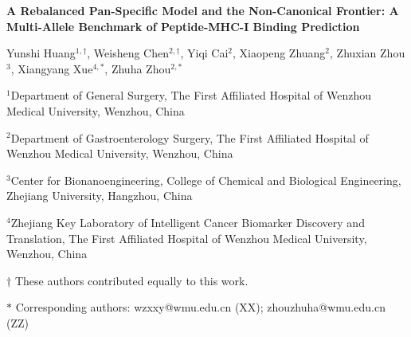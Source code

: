 \documentclass[10pt]{article}
\begin{document}
\begin{center}
{\LARGE\bfseries A Rebalanced Pan-Specific Model and the Non-Canonical Frontier: A Multi-Allele Benchmark of Peptide-MHC-I Binding Prediction\par}
\vspace{1em}
{\large Yunshi Huang$^{1,\dagger}$, Weisheng Chen$^{2,\dagger}$, Yiqi Cai$^{2}$, Xiaopeng Zhuang$^{2}$, Zhuxian Zhou$^{3}$, Xiangyang Xue$^{4,*}$, Zhuha Zhou$^{2,*}$\par}
\vspace{0.6em}
{\normalsize $^{1}$Department of General Surgery, The First Affiliated Hospital of Wenzhou Medical University, Wenzhou, China\par}
{\normalsize $^{2}$Department of Gastroenterology Surgery, The First Affiliated Hospital of Wenzhou Medical University, Wenzhou, China\par}
{\normalsize $^{3}$Center for Bionanoengineering, College of Chemical and Biological Engineering, Zhejiang University, Hangzhou, China\par}
{\normalsize $^{4}$Zhejiang Key Laboratory of Intelligent Cancer Biomarker Discovery and Translation, The First Affiliated Hospital of Wenzhou Medical University, Wenzhou, China\par}
\vspace{0.6em}
{\normalsize $\dagger$ These authors contributed equally to this work.\par}
{\normalsize $*$ Corresponding authors: wzxxy@wmu.edu.cn (XX); zhouzhuha@wmu.edu.cn (ZZ)\par}
\end{center}
\end{document}
